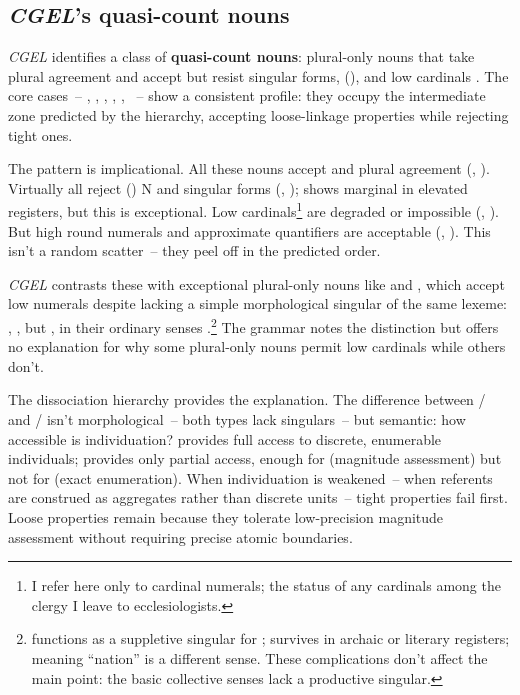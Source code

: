\documentclass[12pt,a4paper]{article}
\begin{document}
\subsection{\textit{CGEL}'s quasi-count nouns}\label{sec:cgel}

\textit{CGEL} identifies a class of \textbf{quasi-count nouns}: plural-only nouns that take plural agreement and accept  but resist singular forms, (), and low cardinals \citep[p.~345]{huddleston2002}. The core cases~-- , , , , , ~-- show a consistent profile: they occupy the intermediate zone predicted by the hierarchy, accepting loose-linkage properties while rejecting tight ones.

The pattern is implicational. All these nouns accept  and plural agreement (, ). Virtually all reject () N and singular forms (, );  shows marginal  in elevated registers, but this is exceptional. Low cardinals\footnote{I refer here only to cardinal numerals; the status of any cardinals among the clergy I leave to ecclesiologists.} are degraded or impossible (, ). But high round numerals and approximate quantifiers are acceptable (, ). This isn't a random scatter~-- they peel off in the predicted order.

\textit{CGEL} contrasts these with exceptional plural-only nouns like  and , which accept low numerals despite lacking a simple morphological singular of the same lexeme: , , but ,  in their ordinary senses \citep[p.~345]{huddleston2002}.\footnote{ functions as a suppletive singular for ;  survives in archaic or literary registers;  meaning “nation” is a different sense. These complications don't affect the main point: the basic collective senses lack a productive singular.} The grammar notes the distinction but offers no explanation for why some plural-only nouns permit low cardinals while others don't.

The dissociation hierarchy provides the explanation. The difference between / and / isn't morphological~-- both types lack singulars~-- but semantic: how accessible is individuation?  provides full access to discrete, enumerable individuals;  provides only partial access, enough for  (magnitude assessment) but not for  (exact enumeration). When individuation is weakened~-- when referents are construed as aggregates rather than discrete units~-- tight properties fail first. Loose properties remain because they tolerate low-precision magnitude assessment without requiring precise atomic boundaries.
\end{document}
